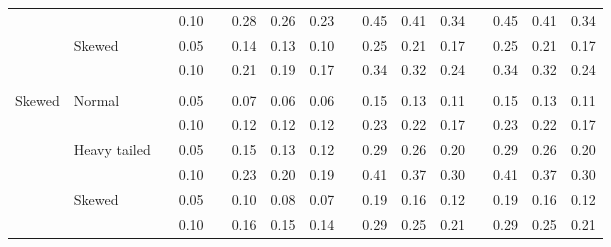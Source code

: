 \documentclass[11pt]{article} %
\begin{document}
\begin{table}[ht]
\begin{scriptsize}
\begin{center}
\begin{tabular}{ll p{.1cm} c p{.1cm} rrr p{.1cm} rrr p{.1cm} rrr}
             &              && 0.10 &&   0.28 & 0.26 & 0.23 && 0.45 & 0.41 & 0.34 && 0.45 & 0.41 & 0.34 \\ 
             & Skewed       && 0.05 &&   0.14 & 0.13 & 0.10 && 0.25 & 0.21 & 0.17 && 0.25 & 0.21 & 0.17 \\ 
             &              && 0.10 &&   0.21 & 0.19 & 0.17 && 0.34 & 0.32 & 0.24 && 0.34 & 0.32 & 0.24 \\ 
             &&&&&&&&&&&&&&&\\
Skewed       & Normal       && 0.05 &&   0.07 & 0.06 & 0.06 && 0.15 & 0.13 & 0.11 && 0.15 & 0.13 & 0.11 \\ 
             &              && 0.10 &&   0.12 & 0.12 & 0.12 && 0.23 & 0.22 & 0.17 && 0.23 & 0.22 & 0.17 \\ 
             & Heavy tailed && 0.05 &&   0.15 & 0.13 & 0.12 && 0.29 & 0.26 & 0.20 && 0.29 & 0.26 & 0.20 \\ 
             &              && 0.10 &&   0.23 & 0.20 & 0.19 && 0.41 & 0.37 & 0.30 && 0.41 & 0.37 & 0.30 \\ 
             & Skewed       && 0.05 &&   0.10 & 0.08 & 0.07 && 0.19 & 0.16 & 0.12 && 0.19 & 0.16 & 0.12 \\ 
             &              && 0.10 &&   0.16 & 0.15 & 0.14 && 0.29 & 0.25 & 0.21 && 0.29 & 0.25 & 0.21 \\ 



\end{tabular}
\end{center}
\end{scriptsize}
\end{table}
\end{document}
